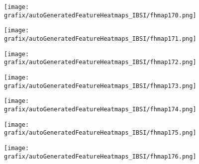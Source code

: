 \hspace{\hsp} 
\begin{subfigure}{\wid\textwidth} 
    \centering 
    \caption{\tiny \sffamily {}} 
    \vspace{\vsp} 
    \texttt{[image: grafix/autoGeneratedFeatureHeatmaps\_IBSI/fhmap170.png]} 
\end{subfigure} 
\hspace{\hsp} 
\begin{subfigure}{\wid\textwidth} 
    \centering 
    \caption{\tiny \sffamily {}} 
    \vspace{\vsp} 
    \texttt{[image: grafix/autoGeneratedFeatureHeatmaps\_IBSI/fhmap171.png]} 
\end{subfigure} 
\hspace{\hsp} 
\begin{subfigure}{\wid\textwidth} 
    \centering 
    \caption{\tiny \sffamily {}} 
    \vspace{\vsp} 
    \texttt{[image: grafix/autoGeneratedFeatureHeatmaps\_IBSI/fhmap172.png]} 
\end{subfigure} 
\hspace{\hsp} 
\begin{subfigure}{\wid\textwidth} 
    \centering 
    \caption{\tiny \sffamily {}} 
    \vspace{\vsp} 
    \texttt{[image: grafix/autoGeneratedFeatureHeatmaps\_IBSI/fhmap173.png]} 
\end{subfigure} 
\hspace{\hsp} 
\begin{subfigure}{\wid\textwidth} 
    \centering 
    \caption{\tiny \sffamily {}} 
    \vspace{\vsp} 
    \texttt{[image: grafix/autoGeneratedFeatureHeatmaps\_IBSI/fhmap174.png]} 
\end{subfigure} 
\hspace{\hsp} 
\begin{subfigure}{\wid\textwidth} 
    \centering 
    \caption{\tiny \sffamily {}} 
    \vspace{\vsp} 
    \texttt{[image: grafix/autoGeneratedFeatureHeatmaps\_IBSI/fhmap175.png]} 
\end{subfigure} 
\hspace{\hsp} 
\begin{subfigure}{\wid\textwidth} 
    \centering 
    \caption{\tiny \sffamily {}} 
    \vspace{\vsp} 
    \texttt{[image: grafix/autoGeneratedFeatureHeatmaps\_IBSI/fhmap176.png]} 
\end{subfigure} 
